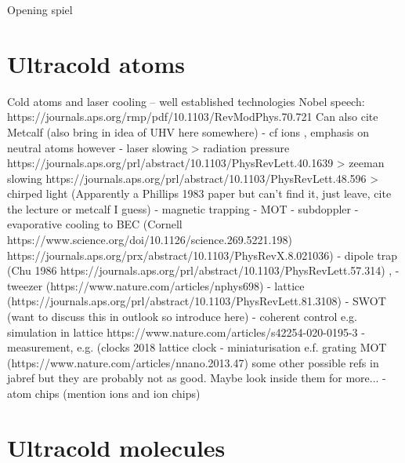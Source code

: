
Opening spiel
\cite{Andre2006}

\section{Ultracold atoms}


Cold atoms and laser cooling -- well established technologies
Nobel speech: https://journals.aps.org/rmp/pdf/10.1103/RevModPhys.70.721
Can also cite Metcalf
(also bring in idea of UHV here somewhere)
- cf ions \cite{}, emphasis on neutral atoms however
- laser slowing
  > radiation pressure https://journals.aps.org/prl/abstract/10.1103/PhysRevLett.40.1639
  > zeeman slowing https://journals.aps.org/prl/abstract/10.1103/PhysRevLett.48.596
  > chirped light (Apparently a Phillips 1983 paper but can't find it, just
  leave, cite the lecture or metcalf I guess)
- magnetic trapping \cite{PhysRevLett.54.2596}
- MOT \cite{PhysRevLett.59.2631}
- subdoppler \cite{Dalibard:89}
- evaporative cooling to BEC (Cornell https://www.science.org/doi/10.1126/science.269.5221.198)
https://journals.aps.org/prx/abstract/10.1103/PhysRevX.8.021036)
- dipole trap (Chu 1986 https://journals.aps.org/prl/abstract/10.1103/PhysRevLett.57.314) ,
- tweezer (https://www.nature.com/articles/nphys698)
- lattice (https://journals.aps.org/prl/abstract/10.1103/PhysRevLett.81.3108)
- SWOT (want to discuss this in outlook so introduce here)
- coherent control e.g. simulation in lattice https://www.nature.com/articles/s42254-020-0195-3
- measurement, e.g. (clocks 2018 lattice clock
- miniaturisation e.f. grating MOT (https://www.nature.com/articles/nnano.2013.47) some other
possible refs in jabref but they are probably not as good. Maybe look inside
them for more...
- atom chips (mention ions and ion chips)

\section{Ultracold molecules}


